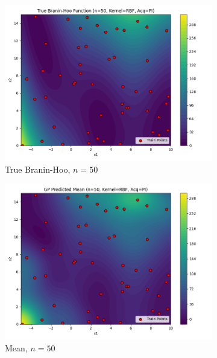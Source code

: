\documentclass[a4paper,12pt]{article}
\begin{document}
\begin{figure}[H]
\begin{subfigure}{0.3\textwidth}
  \includegraphics[width=\linewidth]{Task-02/images/true_function_rbf_n50_PI.png}
  \caption{True Branin-Hoo, $n=50$}
\end{subfigure}
\begin{subfigure}{0.3\textwidth}
    \includegraphics[width=\linewidth]{Task-02/images/gp_mean_rbf_n50_PI.png}
    \caption{Mean, $n=50$}
\end{subfigure}
\begin{subfigure}{0.3\textwidth}

\end{subfigure}
\end{figure}
\end{document}
